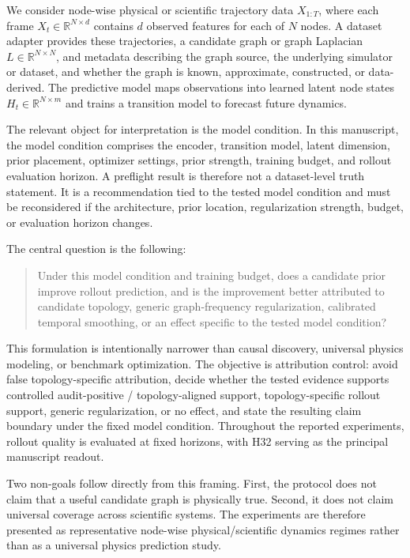 \documentclass[preprint,12pt]{elsarticle}
\begin{document}
We consider node-wise physical or scientific trajectory data $X_{1:T}$, where each frame $X_t \in \mathbb{R}^{N\times d}$ contains $d$ observed features for each of $N$ nodes. A dataset adapter provides these trajectories, a candidate graph or graph Laplacian $L \in \mathbb{R}^{N\times N}$, and metadata describing the graph source, the underlying simulator or dataset, and whether the graph is known, approximate, constructed, or data-derived. The predictive model maps observations into learned latent node states $H_t \in \mathbb{R}^{N\times m}$ and trains a transition model to forecast future dynamics.

The relevant object for interpretation is the model condition. In this manuscript, the model condition comprises the encoder, transition model, latent dimension, prior placement, optimizer settings, prior strength, training budget, and rollout evaluation horizon. A preflight result is therefore not a dataset-level truth statement. It is a recommendation tied to the tested model condition and must be reconsidered if the architecture, prior location, regularization strength, budget, or evaluation horizon changes.

The central question is the following:

\begin{quote}
Under this model condition and training budget, does a candidate prior improve rollout prediction, and is the improvement better attributed to candidate topology, generic graph-frequency regularization, calibrated temporal smoothing, or an effect specific to the tested model condition?
\end{quote}

This formulation is intentionally narrower than causal discovery, universal physics modeling, or benchmark optimization. The objective is attribution control: avoid false topology-specific attribution, decide whether the tested evidence supports controlled audit-positive / topology-aligned support, topology-specific rollout support, generic regularization, or no effect, and state the resulting claim boundary under the fixed model condition. Throughout the reported experiments, rollout quality is evaluated at fixed horizons, with H32 serving as the principal manuscript readout.

Two non-goals follow directly from this framing. First, the protocol does not claim that a useful candidate graph is physically true. Second, it does not claim universal coverage across scientific systems. The experiments are therefore presented as representative node-wise physical/scientific dynamics regimes rather than as a universal physics prediction study.
\end{document}
